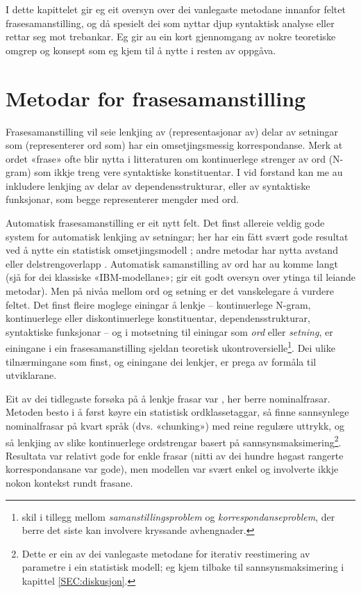 \documentclass[12pt,a4paper,oneside,draft]{report}
\begin{document}
I dette kapittelet gir eg eit oversyn over dei vanlegaste metodane
innanfor feltet frasesamanstilling, og då spesielt dei som nyttar djup
syntaktisk analyse eller rettar seg mot trebankar. Eg gir au ein kort
gjennomgang av nokre teoretiske omgrep og konsept som eg kjem til å
nytte i resten av oppgåva.

\section{Metodar for frasesamanstilling}
\label{sec-2.1}

Frasesamanstilling vil seie lenkjing av (representasjonar av) delar av
setningar som (representerer ord som) har ein omsetjingsmessig
korrespondanse. Merk at ordet «frase» ofte blir nytta i litteraturen
om kontinuerlege strenger av ord (N-gram) som ikkje treng vere
syntaktiske konstituentar. I vid forstand kan me au inkludere lenkjing
av delar av dependensstrukturar, eller av syntaktiske funksjonar, som
begge representerer mengder med ord.

Automatisk frasesamanstilling er eit nytt felt.  Det finst allereie
veldig gode system for automatisk lenkjing av setningar; her har ein
fått svært gode resultat ved å nytte ein statistisk omsetjingsmodell
\citep{chen1993asb}; andre metodar har nytta avstand eller
delstrengoverlapp
\citep[s.~467--484~gir~eit~oversyn]{manning99foundations}.  Automatisk
samanstilling av ord har au komme langt (sjå \citet{brown1993msm} for
dei klassiske «IBM-modellane»; \citet{och2003scv} gir eit godt oversyn
over ytinga til leiande metodar).  Men på nivåa mellom ord og setning
er det vanskelegare å vurdere feltet.  Det finst fleire moglege
einingar å lenkje -- kontinuerlege N-gram, kontinuerlege eller
diskontinuerlege konstituentar, dependensstrukturar, syntaktiske
funksjonar -- og i motsetning til einingar som \emph{ord} eller \emph{setning},
er einingane i ein frasesamanstilling sjeldan teoretisk
ukontroversielle\footnote{\citet[s.~470]{manning99foundations} skil i tillegg mellom
        \emph{samanstillingsproblem} og \emph{korrespondanseproblem}, der berre
        det siste kan involvere kryssande avhengnader. }.  Dei ulike tilnærmingane som finst, og
einingane dei lenkjer, er prega av formåla til utviklarane.

Eit av dei tidlegaste forsøka på å lenkje frasar var
\citet{kupiec1993afn}, her berre nominalfrasar. Metoden besto i å
først køyre ein statistisk ordklassetaggar, så finne sannsynlege
nominalfrasar på kvart språk (dvs. «chunking») med reine regulære
uttrykk, og så lenkjing av slike kontinuerlege ordstrengar basert på
sannsynsmaksimering\footnote{Dette er ein av dei vanlegaste metodane for iterativ
        reestimering av parametre i ein statistisk modell; eg kjem
        tilbake til sannsynsmaksimering i kapittel
        \ref{SEC:diskusjon}. }. Resultata var relativt gode for enkle
frasar (nitti av dei hundre høgast rangerte korrespondansane var
gode), men modellen var svært enkel og involverte ikkje nokon kontekst
rundt frasane.
\end{document}
